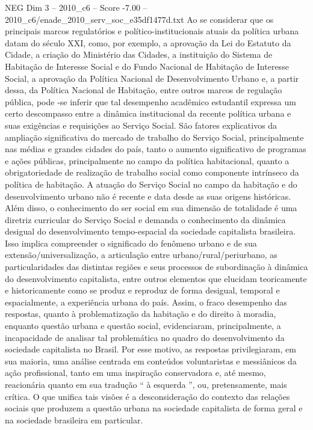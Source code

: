 \begin{textsample}{NEG Dim 3 – 2010\_c6 – Score -7.00 – 2010\_c6/enade\_2010\_serv\_soc\_e35df1477d.txt}
Ao se considerar que os principais marcos regulatórios e político-institucionais atuais da política urbana datam do século XXI, como, por exemplo, a aprovação da Lei do Estatuto da Cidade, a criação do Ministério das Cidades, a instituição do Sistema de Habitação de Interesse Social e do Fundo Nacional de Habitação de Interesse Social, a aprovação da Política Nacional de Desenvolvimento Urbano e, a partir dessa, da Política Nacional de Habitação, entre outros marcos de regulação pública, pode -se inferir que tal desempenho acadêmico estudantil expressa um certo descompasso entre a dinâmica institucional da recente política urbana e suas exigências e requisições ao Serviço Social.
São fatores explicativos da ampliação significativa do mercado de trabalho do Serviço Social, principalmente nas médias e grandes cidades do país, tanto o aumento significativo de programas e ações públicas, principalmente no campo da política habitacional, quanto a obrigatoriedade de realização de trabalho social como componente intrínseco da política de habitação.
A atuação do Serviço Social no campo da habitação e do desenvolvimento urbano não é recente e data desde as suas origens históricas.
Além disso, o conhecimento do ser social em sua dimensão de totalidade é uma diretriz curricular do Serviço Social e demanda o conhecimento da dinâmica desigual do desenvolvimento tempo-espacial da sociedade capitalista brasileira.
Isso implica compreender o significado do fenômeno urbano e de sua extensão/universalização, a articulação entre urbano/rural/periurbano, as particularidades das distintas regiões e seus processos de subordinação à dinâmica do desenvolvimento capitalista, entre outros elementos que elucidam teoricamente e historicamente como se produz e reproduz de forma desigual, temporal e espacialmente, a experiência urbana do país.
Assim, o fraco desempenho das respostas, quanto à problematização da habitação e do direito à moradia, enquanto questão urbana e questão social, evidenciaram, principalmente, a incapacidade de analisar tal problemática no quadro do desenvolvimento da sociedade capitalista no Brasil.
Por esse motivo, as respostas privilegiaram, em sua maioria, uma análise centrada em conteúdos voluntaristas e messiânicos da ação profissional, tanto em uma inspiração conservadora e, até mesmo, reacionária quanto em sua tradução “ à esquerda ”, ou, pretensamente, mais crítica.
O que unifica tais visões é a desconsideração do contexto das relações sociais que produzem a questão urbana na sociedade capitalista de forma geral e na sociedade brasileira em particular.

\end{textsample}
